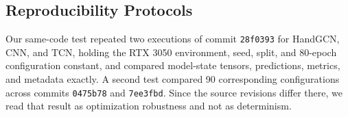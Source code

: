 \subsection{Reproducibility Protocols}

Our same-code test repeated two executions of commit \texttt{28f0393} for HandGCN, CNN, and TCN, holding the RTX 3050 environment, seed, split, and 80-epoch configuration constant, and compared model-state tensors, predictions, metrics, and metadata exactly. A second test compared 90 corresponding configurations across commits \texttt{0475b78} and \texttt{7ee3fbd}. Since the source revisions differ there, we read that result as optimization robustness and not as determinism.